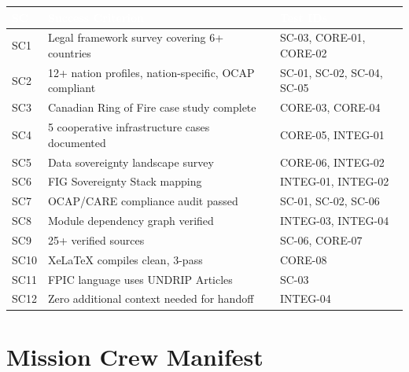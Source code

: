\documentclass[11pt,letterpaper]{article}
\newcommand{\tableheader}[1]{\textbf{\sffamily\textcolor{white}{#1}}}
\begin{document}
\begin{center}
\begin{tabularx}{\textwidth}{L{0.8cm}X L{3.5cm}}
\toprule
{}
\tableheader{SC} & \tableheader{Success Criterion} & \tableheader{Test IDs} \\
\midrule
SC1 & Legal framework survey covering 6+ countries & SC-03, CORE-01, CORE-02 \\
SC2 & 12+ nation profiles, nation-specific, OCAP compliant & SC-01, SC-02, SC-04, SC-05 \\
SC3 & Canadian Ring of Fire case study complete & CORE-03, CORE-04 \\
SC4 & 5 cooperative infrastructure cases documented & CORE-05, INTEG-01 \\
SC5 & Data sovereignty landscape survey & CORE-06, INTEG-02 \\
SC6 & FIG Sovereignty Stack mapping & INTEG-01, INTEG-02 \\
SC7 & OCAP/CARE compliance audit passed & SC-01, SC-02, SC-06 \\
SC8 & Module dependency graph verified & INTEG-03, INTEG-04 \\
SC9 & 25+ verified sources & SC-06, CORE-07 \\
SC10 & XeLaTeX compiles clean, 3-pass & CORE-08 \\
SC11 & FPIC language uses UNDRIP Articles & SC-03 \\
SC12 & Zero additional context needed for handoff & INTEG-04 \\
\bottomrule
\end{tabularx}
\end{center}

\section{Mission Crew Manifest}
\end{document}
